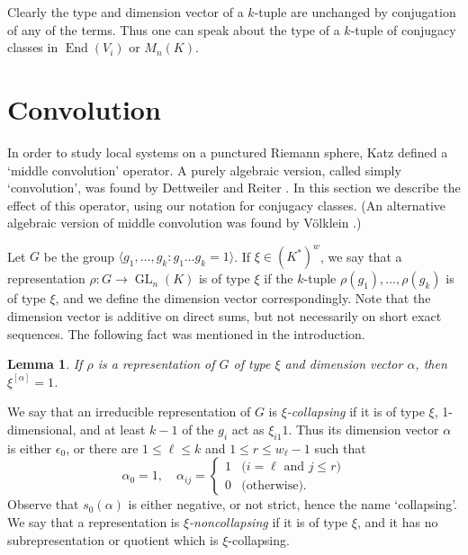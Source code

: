 \documentclass{amsart}
\theoremstyle{plain}
\newtheorem{lem}[thm]{Lemma}
\theoremstyle{definition}
\theoremstyle{remark}
\DeclareMathOperator{\GL}{GL}
\DeclareMathOperator{\End}{End}
\begin{document}
Clearly the type and dimension vector of a $k$-tuple are unchanged by conjugation
of any of the terms. Thus one can speak about the type of a $k$-tuple
of conjugacy classes in $\End(V_i)$ or $M_n(K)$.

























\section{Convolution}
In order to study local systems on a punctured Riemann sphere,
Katz \cite{Katz} defined a `middle convolution' operator.
A purely algebraic version, called simply `convolution', was found by
Dettweiler and Reiter \cite{DR}. In this section we describe the
effect of this operator, using our notation for conjugacy classes.
(An alternative algebraic version of middle convolution was found by V\"olklein \cite{V}.)

Let $G$ be the group $\langle g_1,\dots,g_k : g_1\dots g_k=1 \rangle$.
If $\xi\in(K^*)^w$, we say that a representation $\rho:G\to\GL_n(K)$ is of
type $\xi$ if the $k$-tuple $\rho(g_1),\dots,\rho(g_k)$ is of type $\xi$, and we
define the dimension vector correspondingly. Note that the dimension vector is
additive on direct sums, but not necessarily on short exact sequences.
The following fact was mentioned in the introduction.


\begin{lem}\label{l:repdetcond}
If $\rho$ is a representation of $G$ of type $\xi$ and
dimension vector $\alpha$, then $\xi^{[\alpha]}=1$.
\end{lem}



We say that an irreducible representation of $G$ is \emph{$\xi$-collapsing}
if it is of type $\xi$, 1-dimensional, and at least $k-1$ of the $g_i$ act as $\xi_{i1} 1$.
Thus its dimension vector $\alpha$ is either $\epsilon_0$, or there are $1\le \ell\le k$
and $1\le r\le w_\ell-1$ such that
%
\begin{equation}
\label{e:colldimv}
\alpha_0=1,
\quad
\alpha_{ij} = \begin{cases}
1 & \text{($i=\ell$ and $j\le r$)} \\
0 & \text{(otherwise).}
\end{cases}
\end{equation}
%
Observe that $s_0(\alpha)$ is either negative, or not strict, hence the name `collapsing'.
We say that a representation is \emph{$\xi$-noncollapsing} if it is of type $\xi$,
and it has no subrepresentation or quotient which is $\xi$-collapsing.
\end{document}
